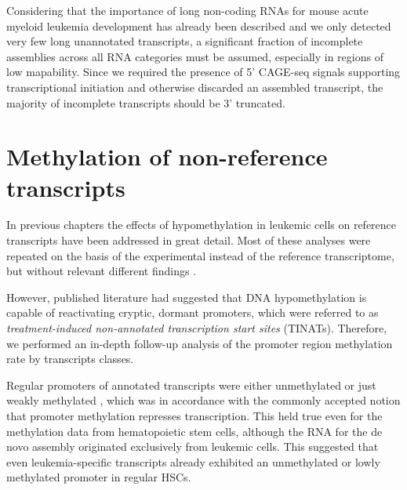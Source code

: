 Considering that the importance of long non-coding RNAs for mouse acute myeloid leukemia development has already been described\cite{Delas2017} and we only detected very few long unannotated transcripts, a significant fraction of incomplete assemblies across all RNA categories must be assumed, especially in regions of low mapability. Since we required the presence of 5' CAGE-seq signals supporting transcriptional initiation and otherwise discarded an assembled transcript, the majority of incomplete transcripts should be 3' truncated. 

\section{Methylation of non-reference transcripts}
\label{chap:r:tinats:denovomethylation} 

In previous chapters the effects of hypomethylation in \dnmtchip leukemic cells on reference transcripts have been addressed in great detail. Most of these analyses were repeated on the basis of the experimental instead of the reference transcriptome, but without relevant different findings \dns. 

However, published literature had suggested that DNA hypomethylation is capable of reactivating cryptic, dormant promoters, which were referred to as \emph{treatment-induced non-annotated transcription start sites} (TINATs)\cite{Brocks2017}. Therefore, we performed an in-depth follow-up analysis of the promoter region methylation rate by transcripts classes.

Regular promoters of annotated transcripts were either unmethylated or just weakly methylated , which was in accordance with the commonly accepted notion that promoter methylation represses transcription. This held true even for the methylation data from hematopoietic stem cells, although the RNA for the de novo assembly originated exclusively from \mllafnine leukemic cells. This suggested that even leukemia-specific transcripts already exhibited an unmethylated or lowly methylated promoter in regular HSCs.

